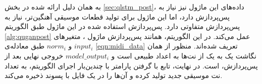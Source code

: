 به همان دلیل ارائه شده در بخش
\ref{sec:qlstm_post}،
داده‌های این ماژول نیز نیاز به پس‌پردازش دارد، اما این ماژول برای تولید قطعات موسیقی آهنگین‌تر، نیاز به پس‌پردازش متفاوتی دارد.
پس‌پردازش استفاده شده در این ماژول طبق الگوریتم
\ref{alg:quganpost}
عمل می‌کند.
در این الگوریتم، همانند پس‌پردازش ماژول
،
متغیرهای
$input_i$
و
$norm_i$
طبق معادله‌ی
\ref{eqn:midi_data}
تعریف شده‌اند. 
منظور از 
همان نگاشت یک به یک از نت‌ها به اعداد طبیعی است و
$model\_output_i$
خروجی نهایی بعد از پس‌پردازش،
است.
در نهایت، تابع
با گرفتن پارامتر
با چندین‌بار اجرای الگوریتم، به تعداد
نت موسیقی جدید تولید کرده و آن‌ها را در یک فایل با پسوند
ذخیره می‌کند.
